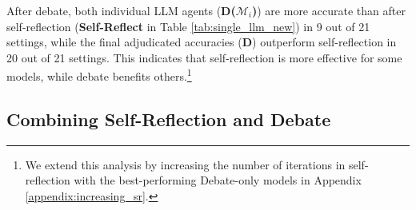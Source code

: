



After debate, both individual LLM agents (\textcolor{rred}{\textbf{D($\mathcal{M}_i$)}}) are more accurate than after self-reflection (\textbf{Self-Reflect} in Table \ref{tab:single_llm_new}) in 9 out of 21 settings, while the final adjudicated accuracies (\textcolor{rred}{\textbf{D}}) outperform self-reflection in 20 out of 21 settings. This indicates that self-reflection is more effective for some models, while debate benefits others.\footnote{We extend this analysis by increasing the number of iterations in self-reflection with the best-performing Debate-only models in Appendix \ref{appendix:increasing_sr}.}




\subsection{Combining Self-Reflection and Debate}
\label{sec:selfreflect_debate}


